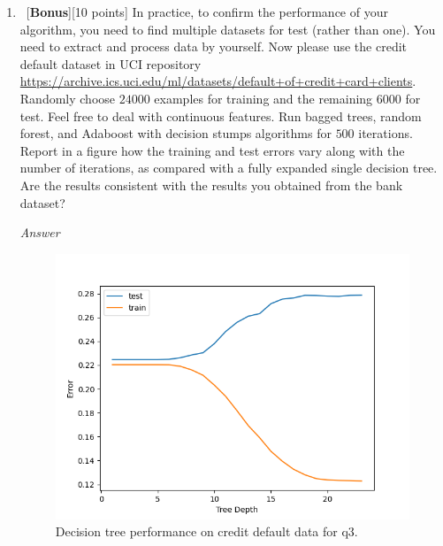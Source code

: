 \documentclass[12pt, fullpage,letterpaper]{article}
\begin{document}
\begin{enumerate}
\begin{enumerate}
	
\end{enumerate}

\item~[\textbf{Bonus}][10 points] In practice, to confirm the performance of your algorithm, you need to find multiple datasets for test (rather than one). You need to extract and process data by yourself. Now please use the credit default dataset in UCI repository \href{https://archive.ics.uci.edu/ml/datasets/default+of+credit+card+clients}{https://archive.ics.uci.edu/ml/datasets/default+of+credit+card+clients}. Randomly choose $24000$ examples for training and the remaining $6000$ for test. Feel free to deal with continuous features. Run bagged trees, random forest, and Adaboost with decision stumps algorithms for $500$ iterations. Report in a figure how the training and test errors vary along with the number of iterations, as compared with a fully expanded single decision tree. Are the results consistent with the results you obtained from the bank dataset?

\emph{Answer}

\begin{figure}[htp]
    \centering
    \includegraphics[width=12cm]{q3_decision_tree_plot.png}
    \caption{Decision tree performance on credit default data for q3.}
    \label{fig:q4a}
\end{figure}


\end{enumerate}
\end{document}
